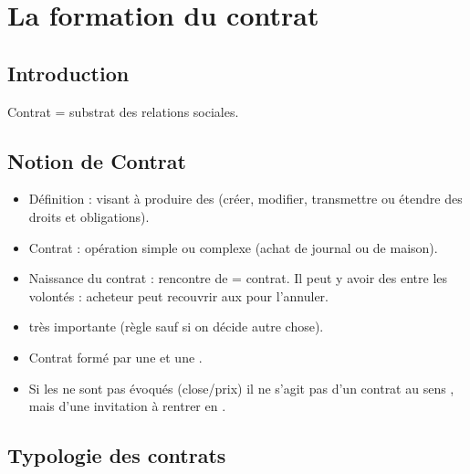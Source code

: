 \section{La formation du contrat}

\subsection{Introduction}

Contrat = substrat des relations sociales.

\subsection{Notion de Contrat}

\begin{itemize}
	\item Définition :  visant à produire des  (créer, modifier, transmettre ou étendre des droits et obligations).
	\item Contrat : opération simple ou complexe (achat de journal ou de maison).
	\item Naissance du contrat : rencontre de  = contrat. Il peut y avoir des  entre les volontés : acheteur peut recouvrir aux  pour l'annuler.
	\item {} très importante (règle sauf si on décide autre chose).
    \item Contrat formé par une  et une .
    \item Si les  ne sont pas évoqués (close/prix) il ne s'agit pas d'un contrat au sens , mais d'une invitation à rentrer en .
\end{itemize}

\subsection{Typologie des contrats}

